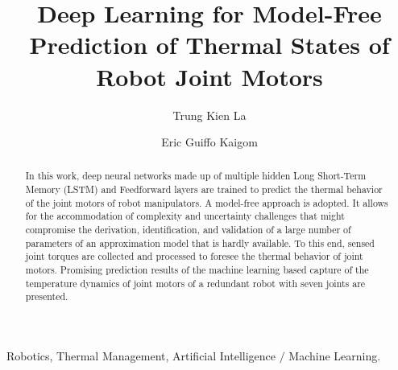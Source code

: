 \documentclass{ifacconf}
\begin{document}
\begin{frontmatter}

\title{Deep Learning for Model-Free Prediction of  Thermal States of Robot Joint Motors} 


\author[First]{Trung Kien La} 
\author[First]{Eric Guiffo Kaigom} 

\address[First]{Department of Computer Science \& Engineering,
Frankfurt University of Applied Sciences, 60318 Frankfurt am Main, Germany (e-mails: trung.la@stud.fra-uas.de; kaigom@fb2.fra-uas.de).}

\begin{abstract}                %
	In this work, deep neural networks made up of multiple hidden Long Short-Term Memory (LSTM) and Feedforward layers are trained to predict the  thermal behavior of the joint motors of robot manipulators. A model-free approach  is adopted. It allows for the accommodation of  complexity and uncertainty challenges that might compromise the derivation, identification, and validation of a large number of  parameters of an approximation model that is hardly available. To this end, sensed joint torques are  collected  and processed  to foresee the thermal behavior of joint motors. Promising prediction results of the machine learning based capture of the temperature dynamics of joint motors of a redundant robot with seven joints are presented. 
\end{abstract}

\begin{keyword}
Robotics, Thermal Management, Artificial Intelligence $\slash$ Machine Learning.
\end{keyword}

\end{frontmatter}
\end{document}
